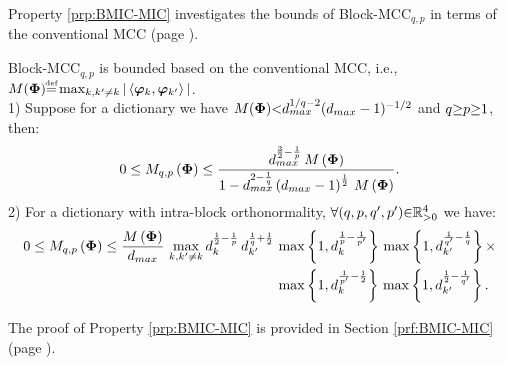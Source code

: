 Property \ref{prp:BMIC-MIC} investigates the bounds of Block-MCC$_{q,p}$ in terms of the conventional MCC (page \pageref{eq:MIC}).
\begin{property}
\label{prp:BMIC-MIC} 
Block-MCC$_{q,p}$ is bounded based on the conventional MCC, i.e., $M(\myPhi) {\myeq} \max_{k,k' \neq k} | \left\langle \boldsymbol{\varphi}_k , \boldsymbol{\varphi}_{k'} \right\rangle|$.\\
1) Suppose for a dictionary  we have $M(\boldsymbol{\Phi}) {<} d_{max}^{1/q {-} 2} (d_{max} - 1)^{-1/2}$ and $q {\geq} p {\geq} 1$, then:
\begin{equation*}
0 \leq M_{q,p}\left( \boldsymbol{\Phi} \right) \leq \frac{d_{max}^{\frac32 - \frac1p} \, M\left( \boldsymbol{\Phi} \right)}{1- d_{max}^{2 - \frac1q} \left( d_{max} - 1 \right)^\frac12 \, M \left( \boldsymbol{\Phi} \right)}.
\end{equation*}
2) For a dictionary with intra-block orthonormality, $\forall (q , p , q' , p') {\in} \mathbb{R}^4_{{>} 0}$ we have:
\begin{gather*}
\begin{aligned}
0 \leq M_{q,p}\left( \boldsymbol{\Phi} \right) \leq 
\frac{M\left( \boldsymbol{\Phi} \right)}{d_{max}} \, \max_{k,k' \neq k} d_{k}^{\frac12 - \frac1p} \, d_{k'}^{\frac1q + \frac12} \, &\max \left\lbrace 1 , d_k^{\frac1p - \frac{1}{p'}} \right\rbrace \, \max \left\lbrace 1 , d_{k'}^{\frac{1}{q'} - \frac1q} \right\rbrace \times \\
&\max \left\lbrace 1 , d_k^{\frac{1}{p'} -\frac12} \right\rbrace \, \max \left\lbrace 1 , d_{k'}^{\frac{1}{2} - \frac{1}{q'}} \right\rbrace.
\end{aligned}
\end{gather*}
\end{property}
The proof of Property \ref{prp:BMIC-MIC} is provided in Section \ref{prf:BMIC-MIC} (page \pageref{prf:BMIC-MIC}).

